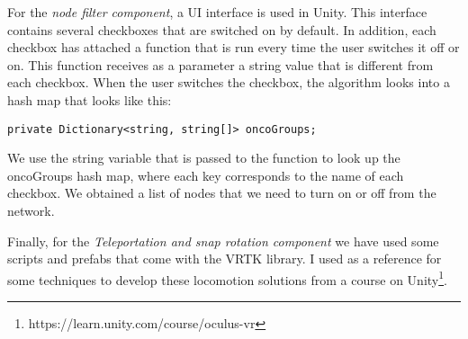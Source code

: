 For the \textit{node filter component}, a UI interface is used in Unity. This interface contains several checkboxes that are switched on by default. In addition, each checkbox has attached a function that is run every time the user switches it off or on. This function receives as a parameter a string value that is different from each checkbox. When the user switches  the checkbox, the algorithm looks into a hash map that looks like this:

\begin{verbatim}
private Dictionary<string, string[]> oncoGroups;
\end{verbatim}

We use the string variable that is passed to the function to look up the oncoGroups hash map, where each key corresponds to the name of each checkbox. We obtained a list of nodes that we need to turn on or off from the network.

Finally, for the \textit{Teleportation and snap rotation component} we have used some scripts and prefabs that come with the VRTK library. I used as a reference for some techniques to develop these locomotion solutions from a course on Unity\footnote{https://learn.unity.com/course/oculus-vr}.

